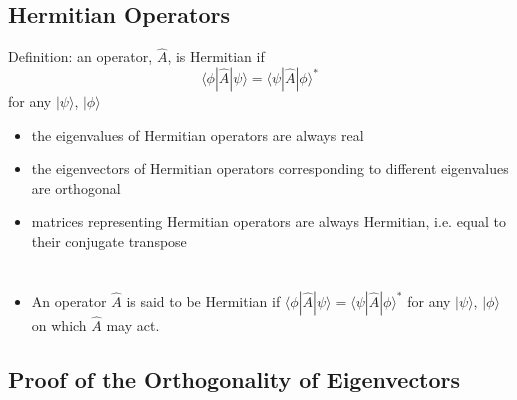 \documentclass[a4paper,11pt,normalem]{article}
\begin{document}
\subsection{Hermitian Operators}\label{hermitian-operators}

Definition: an operator, \(\hat{A}\), is Hermitian if \[
    \langle\phi|\hat{A}|\psi\rangle = \langle\psi|\hat{A}|\phi\rangle^*
\] for any \(|\psi\rangle\), \(|\phi\rangle\)

\begin{itemize}
\item
  the eigenvalues of Hermitian operators are always real
\item
  the eigenvectors of Hermitian operators corresponding to different
  eigenvalues are orthogonal
\item
  matrices representing Hermitian operators are always Hermitian,
  i.e. equal to their conjugate transpose
\end{itemize}

\section{}\label{lecture-8}

\begin{itemize}
\item
  An operator \(\hat{A}\) is said to be Hermitian if
  \(\langle\phi|\hat{A}|\psi\rangle = \langle\psi|\hat{A}|\phi\rangle^{*}\)
  for any \(|\psi\rangle\), \(|\phi\rangle\) on which \(\hat{A}\) may
  act.
\end{itemize}

\subsection{Proof of the Orthogonality of Eigenvectors}\label{proof-of-the-orthogonality-of-eigenvectors}
\end{document}
